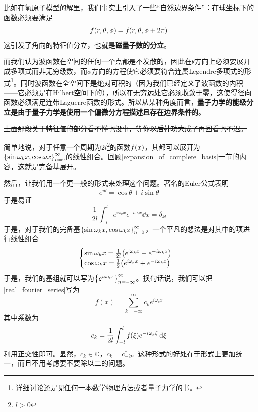 \documentclass[12pt,a4paper,openany,twoside]{book}
\numberwithin{equation}{section}
\begin{document}
        比如在氢原子模型的解里，我们事实上引入了一些“自然边界条件”：在球坐标下的函数必须要满足
        \begin{equation}
          f\qty(r,\theta, \phi)=f\qty(r,\theta,\phi+2\pi)
        \end{equation}
        这引发了角向的特征值分立，也就是\textbf{磁量子数的分立}。

        而我们认为波函数在空间的任何一个点都是不发散的，因此在$\theta$方向上必须要展开成多项式而非无穷级数，而$\phi$方向的方程使它必须要符合连属Legendre多项式的形式\footnote{详细讨论还是见任何一本数学物理方法或者量子力学的书。}。同时波函数在全空间下是绝对可积的（因为我们已经定义了波函数的内积——它必须是在Hilbert空间下的），所以在无穷远处它必须收敛于零，这使得径向函数必须满足连带Laguerre函数的形式。所以从某种角度而言，\textbf{量子力学的能级分立是由于量子力学是使用一个偏微分方程描述且存在边界条件的}。

        \sout{上面那段关于特征值的部分看不懂也没事，等你以后神功大成了再回看也不迟。}
        
        简单地说，对于任意一个周期为$2l$\footnote{$l>0$}的函数$f\qty(x)$，其都可以展开为$\qty{\sin{\omega_k x},\cos{\omega x}}_{n=0}^\infty$的线性组合。回顾\ref{expansion_of_complete_basis}一节的内容，这就是完备基展开。

        然后，让我们用一个更一般的形式来处理这个问题。著名的Euler公式表明
        \begin{equation}
          e^{i\theta}=\cos\theta+i\sin\theta
        \end{equation}
        于是易证
        \begin{equation}
          \frac{1}{2l}\int_{-l}^l{e^{i\omega_k x}e^{-i\omega_l x}\dd{x}}=\delta_{kl}
        \end{equation}
        于是，对于我们的完备基$\qty{\sin{\omega_k x},\cos{\omega_k x}}_{n=0}^\infty$，一个平凡的想法是对其中的项进行线性组合
        \begin{equation}
          \begin{cases}
            \sin{\omega_k x}=\frac{1}{2i}\qty(e^{i\omega_k x}-e^{-i\omega_k x})\\
            \cos{\omega_k x}=\frac{1}{2}\qty(e^{i\omega_k x}+e^{-i\omega_k x})
          \end{cases}
        \end{equation}
        于是，我们的基组就可以写为$\qty{e^{i\omega_k x}}_{n=-\infty}^\infty$。换句话说，我们可以把\ref{real_fourier_series}写为
        \begin{equation}
          f(x) = \sum_{k=-\infty}^{\infty}{c_k e^{i\omega_k x}}
        \end{equation}
        其中系数为
        \begin{equation}
          c_k=\frac{1}{2l}\int_{-l}^l{f\qty(\xi)e^{-i\omega_k\xi}\dd{\xi}}
        \end{equation}
        利用正交性即可。显然，$c_k\in\mathbb{C}$，$c_k=c_{-k}^*$。这种形式的好处在于形式上更加统一，而且不用考虑要不要除以二的问题。
\end{document}
